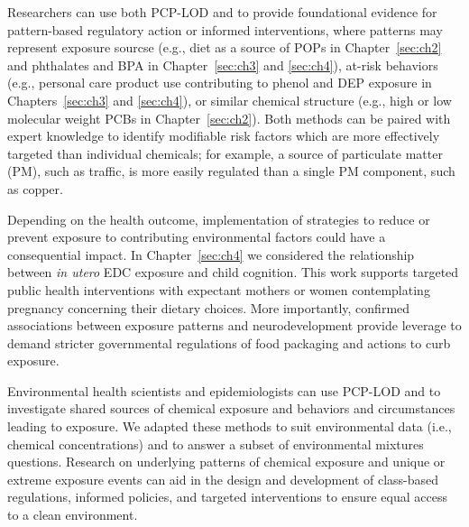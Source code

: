 Researchers can use both PCP-LOD and \bnmf to provide foundational evidence for pattern-based regulatory action or informed interventions, where patterns may represent exposure sourcse (e.g., diet as a source of POPs in Chapter~\ref{sec:ch2} and phthalates and BPA in Chapter~\ref{sec:ch3} and  \ref{sec:ch4}), at-risk behaviors (e.g., personal care product use contributing to phenol and DEP exposure in Chapters~\ref{sec:ch3} and \ref{sec:ch4}), or similar chemical structure (e.g., high or low molecular weight PCBs in Chapter~\ref{sec:ch2}). Both methods can be paired with expert knowledge to identify modifiable risk factors which are more effectively targeted than individual chemicals; for example, a source of particulate matter (PM), such as traffic, is more easily regulated than a single PM component, such as copper.

Depending on the health outcome, implementation of strategies to reduce or prevent exposure to contributing environmental factors could have a consequential impact. In Chapter~\ref{sec:ch4} we considered the relationship between \textit{in utero} EDC exposure and child cognition. This work supports targeted public health interventions with expectant mothers or women contemplating pregnancy concerning their dietary choices. More importantly, confirmed associations between exposure patterns and neurodevelopment provide leverage to demand stricter governmental regulations of food packaging and actions to curb exposure.

Environmental health scientists and epidemiologists can use PCP-LOD and \bnmf to investigate shared sources of chemical exposure and behaviors and circumstances leading to exposure. We adapted these methods to suit environmental data (i.e., chemical concentrations) and to answer a subset of environmental mixtures questions. Research on underlying patterns of chemical exposure and unique or extreme exposure events can aid in the design and development of class-based regulations, informed policies, and targeted interventions to ensure equal access to a clean environment.
